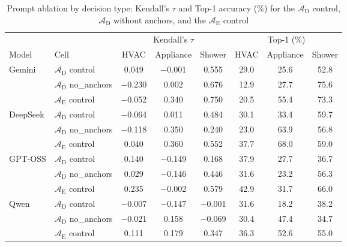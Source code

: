 \begin{table}[htbp]
\centering
\footnotesize
\caption{Prompt ablation by decision type: Kendall's $\tau$ and Top-1 accuracy (\%) for the $\mathcal{A}_{\text{D}}$ control, $\mathcal{A}_{\text{D}}$ without anchors, and the $\mathcal{A}_{\text{E}}$ control}
\label{tab:prompt_ablation_bytype}
\renewcommand{\arraystretch}{1.15}
\setlength{\tabcolsep}{4pt}
\begin{tabular}{ll ccc ccc}
\toprule
& & \multicolumn{3}{c}{Kendall's $\tau$} & \multicolumn{3}{c}{Top-1 (\%)} \\
\cmidrule(lr){3-5}\cmidrule(lr){6-8}
Model & Cell & HVAC & Appliance & Shower & HVAC & Appliance & Shower \\
\midrule
Gemini & $\mathcal{A}_{\text{D}}$ control & 0.049 & $-$0.001 & 0.555 & 29.0 & 25.6 & 52.8 \\
 & $\mathcal{A}_{\text{D}}$ no\_anchors & $-$0.230 & 0.002 & 0.676 & 12.9 & 27.7 & 75.6 \\
 & $\mathcal{A}_{\text{E}}$ control & $-$0.052 & 0.340 & 0.750 & 20.5 & 55.4 & 73.3 \\
\addlinespace
DeepSeek & $\mathcal{A}_{\text{D}}$ control & $-$0.064 & 0.011 & 0.484 & 30.1 & 33.4 & 59.7 \\
 & $\mathcal{A}_{\text{D}}$ no\_anchors & $-$0.118 & 0.350 & 0.240 & 23.0 & 63.9 & 56.8 \\
 & $\mathcal{A}_{\text{E}}$ control & 0.040 & 0.360 & 0.552 & 37.7 & 68.0 & 59.0 \\
\addlinespace
GPT-OSS & $\mathcal{A}_{\text{D}}$ control & 0.140 & $-$0.149 & 0.168 & 37.9 & 27.7 & 36.7 \\
 & $\mathcal{A}_{\text{D}}$ no\_anchors & 0.029 & $-$0.146 & 0.446 & 31.6 & 23.2 & 56.3 \\
 & $\mathcal{A}_{\text{E}}$ control & 0.235 & $-$0.002 & 0.579 & 42.9 & 31.7 & 66.0 \\
\addlinespace
Qwen & $\mathcal{A}_{\text{D}}$ control & $-$0.007 & $-$0.147 & $-$0.001 & 31.6 & 18.2 & 38.2 \\
 & $\mathcal{A}_{\text{D}}$ no\_anchors & $-$0.021 & 0.158 & $-$0.069 & 30.4 & 47.4 & 34.7 \\
 & $\mathcal{A}_{\text{E}}$ control & 0.111 & 0.179 & 0.347 & 36.3 & 52.6 & 55.0 \\

\bottomrule
\end{tabular}
\setlength{\tabcolsep}{6pt}
\renewcommand{\arraystretch}{1.0}
\end{table}

